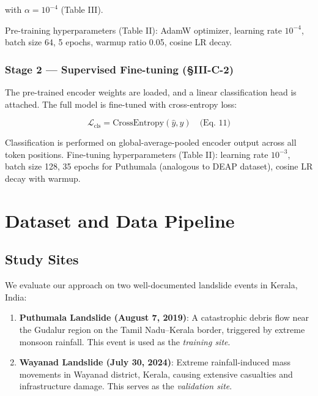 \documentclass[conference]{IEEEtran}
\begin{document}
with $\alpha = 10^{-4}$ (Table III).

Pre-training hyperparameters (Table II): AdamW optimizer, learning rate $10^{-4}$, batch size 64, 5 epochs, warmup ratio 0.05, cosine LR decay.

\subsubsection{Stage 2 — Supervised Fine-tuning (\S III-C-2)}

The pre-trained encoder weights are loaded, and a linear classification head is attached. The full model is fine-tuned with cross-entropy loss:

\begin{equation}
    \mathcal{L}_\text{cls} = \text{CrossEntropy}(\hat{y}, y) \quad \text{(Eq. 11)}
\end{equation}

Classification is performed on global-average-pooled encoder output across all token positions. Fine-tuning hyperparameters (Table II): learning rate $10^{-3}$, batch size 128, 35 epochs for Puthumala (analogous to DEAP dataset), cosine LR decay with warmup.

\section{Dataset and Data Pipeline}

\subsection{Study Sites}

We evaluate our approach on two well-documented landslide events in Kerala, India:

\begin{enumerate}
    \item \textbf{Puthumala Landslide (August 7, 2019)}: A catastrophic debris flow near the Gudalur region on the Tamil Nadu--Kerala border, triggered by extreme monsoon rainfall. This event is used as the \textit{training site}.
    
    \item \textbf{Wayanad Landslide (July 30, 2024)}: Extreme rainfall-induced mass movements in Wayanad district, Kerala, causing extensive casualties and infrastructure damage. This serves as the \textit{validation site}.
\end{enumerate}
\end{document}
